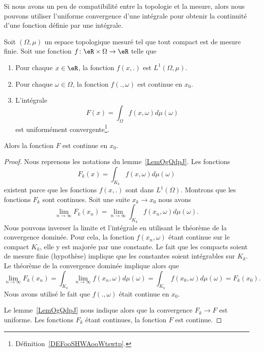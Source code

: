 Si nous avons un peu de compatibilité entre la topologie et la mesure, alors nous pouvons utiliser l'uniforme convergence d'une intégrale pour obtenir la continuité d'une fonction définie par une intégrale.

\begin{theorem} \label{ThotexmgE}
	Soit \( (\Omega,\mu)\) un espace topologique mesuré tel que tout compact est de mesure finie. Soit une fonction \( f\colon \eR\times \Omega\to \eR\) telle que
	\begin{enumerate}
		\item
		      Pour chaque \( x\in \eR\), la fonction \( f(x,.)\) est \( L^1(\Omega,\mu)\).
		\item
		      Pour chaque \( \omega\in \Omega\), la fonction \( f(.,\omega)\) est continue en \( x_0\).
		\item
		      L'intégrale
		      \begin{equation}
			      F(x)=\int_{\Omega}f(x,\omega)d\mu(\omega)
		      \end{equation}
		      est uniformément convergente\footnote{Définition~\ref{DEFooSHWAooWtswtp}.}.
	\end{enumerate}
	Alors la fonction \( F\) est continue en \( x_0\).
\end{theorem}

\begin{proof}
	Nous reprenons les notations du lemme~\ref{LemOgQdpJ}. Les fonctions
	\begin{equation}
		F_k(x)=\int_{K_k}f(x,\omega)d\mu(\omega)
	\end{equation}
	existent parce que les fonctions \( f(x,.)\) sont dans \( L^1(\Omega)\). Montrons que les fonctions \( F_k\) sont continues. Soit une suite \( x_k\to x_0\) nous avons
	\begin{equation}
		\lim_{n\to \infty} F_k(x_n)=\lim_{n\to \infty} \int_{K_k}f(x_n,\omega)d\mu(\omega).
	\end{equation}
	Nous pouvons inverser la limite et l'intégrale en utilisant le théorème de la convergence dominée. Pour cela, la fonction \( f(x_n,\omega)\) étant continue sur le compact \( K_k\), elle y est majorée par une constante. Le fait que les compacts soient de mesure finie (hypothèse) implique que les constantes soient intégrables sur \( K_k\). Le théorème de la convergence dominée implique alors que
	\begin{equation}
		\lim_{n\to \infty} F_k(x_n)=\int_{K_k}\lim_{n\to \infty} f(x_n,\omega)d\mu(\omega)=\int_{K_k}f(x_0,\omega)d\mu(\omega)=F_k(x_0).
	\end{equation}
	Nous avons utilisé le fait que \( f(.,\omega)\) était continue en \( x_0\).

	Le lemme~\ref{LemOgQdpJ} nous indique alors que la convergence \( F_k\to F\) est uniforme. Les fonctions \( F_k\) étant continues, la fonction \( F\) est continue.
\end{proof}

